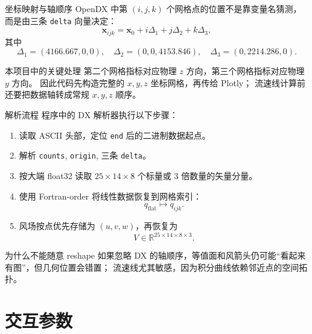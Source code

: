 \documentclass[aspectratio=169,11pt]{ctexbeamer}
\newcommand{\R}{\mathbb R}
\newcommand{\vx}{\mathbf x}
\begin{document}
\begin{frame}{坐标映射与轴顺序}
  \small
  OpenDX 中第 $(i,j,k)$ 个网格点的位置不是靠变量名猜测，而是由三条 \texttt{delta} 向量决定：
  \[
    \vx_{ijk}
    =\vx_0+i\Delta_1+j\Delta_2+k\Delta_3 ,
  \]
  其中
  \[
    \Delta_1=(4166.667,0,0),\quad
    \Delta_2=(0,0,4153.846),\quad
    \Delta_3=(0,2214.286,0).
  \]

  \begin{block}{本项目中的关键处理}
    第二个网格指标对应物理 $z$ 方向，第三个网格指标对应物理 $y$ 方向。
    因此代码先构造完整的 $x,y,z$ 坐标网格，再传给 Plotly；
    流速线计算前还要把数据轴转成常规 $x,y,z$ 顺序。
  \end{block}
\end{frame}

\begin{frame}{解析流程}
  \small
  程序中的 DX 解析器执行以下步骤：

  \begin{enumerate}
    \item 读取 ASCII 头部，定位 \texttt{end} 后的二进制数据起点。
    \item 解析 \texttt{counts}, \texttt{origin}, 三条 \texttt{delta}。
    \item 按大端 float32 读取 $25\times14\times8$ 个标量或 $3$ 倍数量的矢量分量。
    \item 使用 Fortran-order 将线性数据恢复到网格索引：
      \[
        q_{\mathrm{flat}}\longmapsto q_{ijk}.
      \]
    \item 风场按点优先存储为 $(u,v,w)$，再恢复为
      \[
        V\in\R^{25\times14\times8\times3}.
      \]
  \end{enumerate}

  \begin{block}{为什么不能随意 reshape}
    如果忽略 DX 的轴顺序，等值面和风箭头仍可能“看起来有图”，但几何位置会错置；
    流速线尤其敏感，因为积分曲线依赖邻近点的空间拓扑。
  \end{block}
\end{frame}

\section{交互参数}
\end{document}
